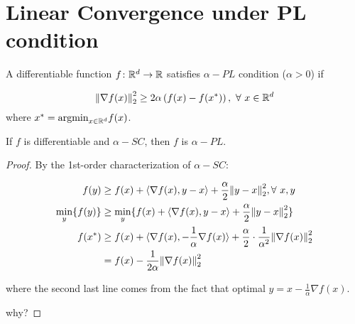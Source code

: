 \section{Linear Convergence under PL condition}

\begin{definition}
    A differentiable function \(f \colon \mathbb{R}^d \to \mathbb{R}\) satisfies \(\alpha-PL\) condition 
    (\(\alpha > 0\)) if 

    \[
        \norm{\nabla f (x)}_2^2 \geq 2 \alpha \left( f(x) - f(x^*) \right), \ \forall \ x \in \mathbb{R}^d   
    \]
    where \( x^* = \text{argmin}_{x \in \mathbb{R}^d} f(x)\). 
\end{definition}

\begin{lemma}
    If \(f\) is differentiable and \(\alpha-SC\), then \(f\) is \(\alpha-PL\). 
\end{lemma}


\begin{proof}
    By the 1st-order characterization of \(\alpha-SC\): 

    \begin{align*}
        f(y) &\geq f(x) + \langle \nabla f(x), y - x \rangle + \frac{\alpha}{2} \norm{y - x}_2^2, \forall \ x,y \\ 
        \min_y \{ f(y)  \} &\geq \min_{y} \{ f(x) +  \langle \nabla f(x), y - x \rangle +\frac{\alpha}{2} \norm{y - x}_2^2 \} \\ 
        f(x^*) &\geq f(x) + \langle \nabla f(x), - \frac{1}{\alpha}\nabla f(x) \rangle 
        + \frac{\alpha}{2} \cdot \frac{1}{\alpha^2} \norm{ \nabla f(x) }_2^2 \\ 
        &= f(x) - \frac{1}{2 \alpha} \norm{ \nabla f(x) }_2^2
    \end{align*}

    where the second last line comes from the fact that optimal \(y = x - \frac{1}{\alpha} \nabla f(x)\). 

    \color{red} why?


    


\end{proof}


